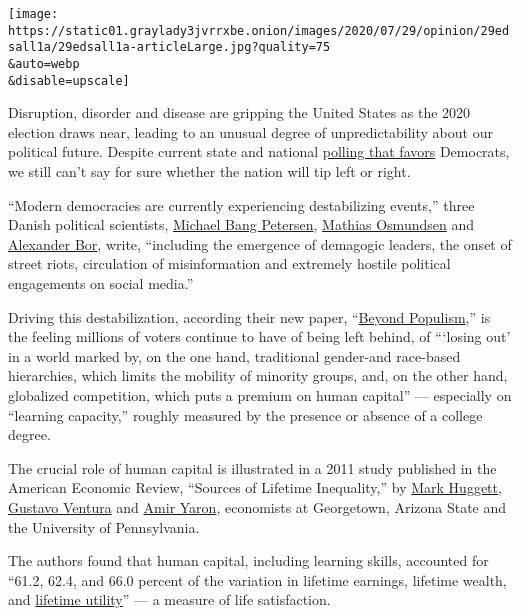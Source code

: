 \texttt{[image: https://static01.graylady3jvrrxbe.onion/images/2020/07/29/opinion/29edsall1a/29edsall1a-articleLarge.jpg?quality=75\\\&auto=webp\\\&disable=upscale]}

Disruption, disorder and disease are gripping the United States as the
2020 election draws near, leading to an unusual degree of
unpredictability about our political future. Despite current state and
national \href{https://projects.fivethirtyeight.com/polls/}{polling that
favors} Democrats, we still can't say for sure whether the nation will
tip left or right.

``Modern democracies are currently experiencing destabilizing events,''
three Danish political scientists,
\href{https://pure.au.dk/portal/en/persons/michael-bang-petersen(7998cc16-75d5-4065-8b6e-395d73e22151).html}{Michael
Bang Petersen},
\href{https://pure.au.dk/portal/en/persons/mathias-osmundsen(a453964f-daa7-4f40-94d0-fde773a485d4).html}{Mathias
Osmundsen} and
\href{https://pure.au.dk/portal/en/persons/alexander-bor(df35f529-baf4-4bbf-916e-9dac13baf052).html}{Alexander
Bor}, write, ``including the emergence of demagogic leaders, the onset
of street riots, circulation of misinformation and extremely hostile
political engagements on social media.''

Driving this destabilization, according their new paper,
``\href{https://psyarxiv.com/puqzs}{Beyond Populism},'' is the feeling
millions of voters continue to have of being left behind, of ```losing
out' in a world marked by, on the one hand, traditional gender-and
race-based hierarchies, which limits the mobility of minority groups,
and, on the other hand, globalized competition, which puts a premium on
human capital'' --- especially on ``learning capacity,'' roughly
measured by the presence or absence of a college degree.

The crucial role of human capital is illustrated in a 2011 study
published in the American Economic Review, ``Sources of Lifetime
Inequality,'' by
\href{https://sites.google.com/georgetown.edu/mark-huggett/home}{Mark
Huggett}, \href{http://www.gustavoventura.com/index.html}{Gustavo
Ventura} and \href{https://fnce.wharton.upenn.edu/profile/yarona/}{Amir
Yaron}, economists at Georgetown, Arizona State and the University of
Pennsylvania.

The authors found that human capital, including learning skills,
accounted for ``61.2, 62.4, and 66.0 percent of the variation in
lifetime earnings, lifetime wealth, and
\href{https://www.economicshelp.org/blog/26552/concepts/measuring-utility/}{lifetime
utility}'' --- a measure of life satisfaction.


